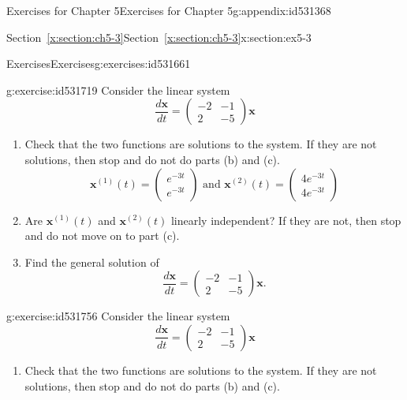 \documentclass[oneside,10pt,]{book}
\newcommand{\xreffont}{\relax}
\numberwithin{equation}{section}
\numberwithin{equation}{section}
\newcommand{\amp}{&}
\begin{document}
\begin{appendixptx}{Exercises for Chapter 5}{}{Exercises for Chapter 5}{}{}{g:appendix:id531368}
\begin{sectionptx}{Section~{\xreffont\ref*{x:section:ch5-3}}}{}{Section~{\xreffont\ref*{x:section:ch5-3}}}{}{}{x:section:ex5-3}
\begin{exercises-subsection-numberless}{Exercises}{}{Exercises}{}{}{g:exercises:id531661}
\begin{divisionexercise}{2}{}{}{g:exercise:id531719}%
Consider the linear system%
\begin{equation*}
\frac{d\mathbf{x}}{dt}=\left(\begin{array}{cc}
-2 \amp -1\\
2 \amp -5
\end{array}\right)\mathbf{x}
\end{equation*}
%
%
\begin{enumerate}[label=(\alph*)]
\item{}Check that the two functions are solutions to the system. If they are not solutions, then stop and do not do parts (b) and (c).%
\begin{equation*}
\mathbf{x}^{(1)}(t)=\left(\begin{array}{c}
e^{-3t}\\
e^{-3t}
\end{array}\right)\text{ and }\mathbf{x}^{(2)}(t)=\left(\begin{array}{c}
4e^{-3t}\\
4e^{-3t}
\end{array}\right)
\end{equation*}
%
\item{}Are \(\mathbf{x}^{(1)}(t)\) and \(\mathbf{x}^{(2)}(t)\) linearly independent? If they are not, then stop and do not move on to part (c).%
\item{}Find the general solution of%
\begin{equation*}
\frac{d\mathbf{x}}{dt}=\left(\begin{array}{cc}
-2 \amp -1\\
2 \amp -5
\end{array}\right)\mathbf{x}.
\end{equation*}
%
\end{enumerate}
\end{divisionexercise}%
\begin{divisionexercise}{3}{}{}{g:exercise:id531756}%
Consider the linear system%
\begin{equation*}
\frac{d\mathbf{x}}{dt}=\left(\begin{array}{cc}
-2 \amp -1\\
2 \amp -5
\end{array}\right)\mathbf{x}
\end{equation*}
%
%
\begin{enumerate}[label=(\alph*)]
\item{}Check that the two functions are solutions to the system. If they are not solutions, then stop and do not do parts (b) and (c).%

\end{enumerate}
\end{divisionexercise}
\end{exercises-subsection-numberless}
\end{sectionptx}
\end{appendixptx}
\end{document}

